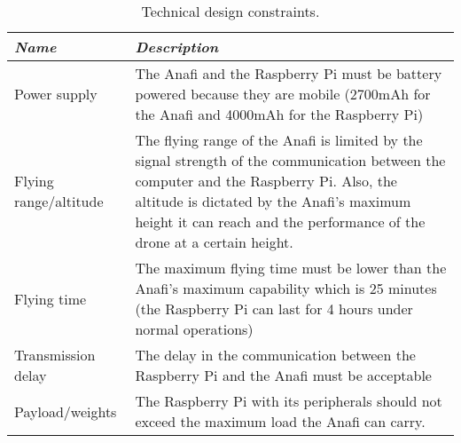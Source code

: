 \documentclass[../main.tex]{subfiles}
\begin{document}
\begin{table}[H]
    \centering
    \caption{Technical design constraints.}
    \label{tab:technical-design-constraints}
    \begin{tabular}{ P{2.8cm} P{12.2cm} }
        \toprule
        \textit{Name} 
            & \textit{Description} \\

        \midrule

        Power supply  
            & The Anafi and the Raspberry Pi must be 
            battery powered because they are mobile 
            (2700mAh for the Anafi 
            and 4000mAh for the Raspberry Pi)  \\

        Flying range/altitude 
            & The flying range of the Anafi is limited 
            by the signal strength of the communication 
            between the computer and the Raspberry Pi. 
            Also, the altitude is dictated by the Anafi’s 
            maximum height it can reach and the performance 
            of the drone at a certain height. \\

        Flying time  
            & The maximum flying time must be lower than 
            the Anafi’s maximum capability which is 25 minutes 
            (the Raspberry Pi can last for 4 hours under normal
            operations) \\ 

        Transmission delay  
            & The delay in the communication between 
            the Raspberry Pi and the Anafi must be acceptable \\

        Payload/weights  
            & The Raspberry Pi with its peripherals should not 
            exceed the maximum load the Anafi can carry. \\

        \bottomrule
    \end{tabular}
\end{table}
\end{document}
